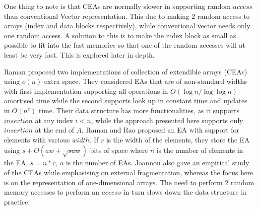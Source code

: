 One thing to note is that CEAs are normally slower in supporting random $access$ than conventional Vector representation. This due to making 2 random access to arrays (index and data blocks respectively), while conventional vector needs only one random access. A solution to this is to make the index block as small as possible to fit into the fast memories so that one of the random accesses will at least be very fast. This is explored later in depth.\par
Raman \cite{Raman_2001} proposed two implementations of collection of extendible arrays (CEAs) using $o(n)$ extra space. They considered EAs that are of non-standard widths with first implementation supporting all operations in $O(\log n/ \log \log n)$ amortised time while the second supports look up in constant time and updates in $O(n^e)$ time. Their data structure has more functionalities, as it supports $insertion$ at any index $i < n$, while the approach presented here supports only $insertion$ at the end of $A$. Raman and Rao \cite{Raman_2003} proposed an EA with support for elements with various $width$. If $r$ is the width of the elements, they store the EA using $s+O(aw + \sqrt{saw})$ bits of space where $n$ is the number of elements in the EA, $s = n*r$, $a$ is the number of EAs. Joannou \cite{Stelios_2001} also gave an empirical study of the CEAs while emphasising on external fragmentation, whereas the focus here is on the representation of one-dimensional arrays. The need to perform 2 random memory accesses to perform an $access$ in turn slows down the data structure in practice.
\FloatBarrier
